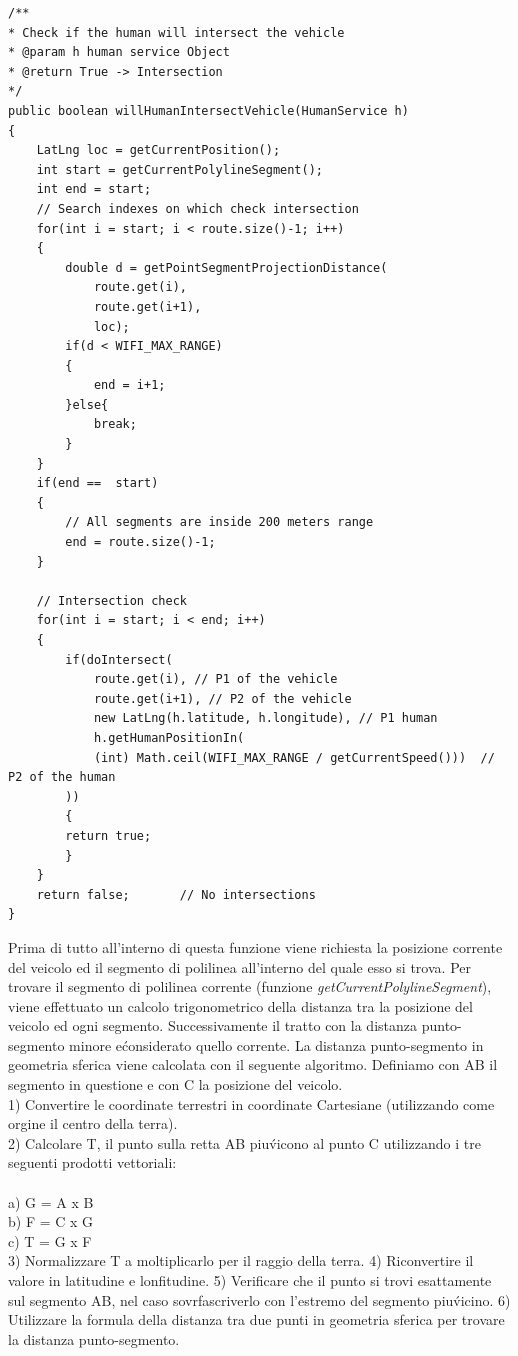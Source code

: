 \documentclass[conference]{IEEEtran}
\begin{document}
\begin{lstlisting}
/**
* Check if the human will intersect the vehicle
* @param h human service Object
* @return True -> Intersection
*/
public boolean willHumanIntersectVehicle(HumanService h) 
{
	LatLng loc = getCurrentPosition();
	int start = getCurrentPolylineSegment();
	int end = start;
	// Search indexes on which check intersection
	for(int i = start; i < route.size()-1; i++)
	{
		double d = getPointSegmentProjectionDistance(
			route.get(i),
			route.get(i+1),
			loc);
		if(d < WIFI_MAX_RANGE)
		{
			end = i+1;
		}else{
			break;
		}
	}
	if(end ==  start)
	{
		// All segments are inside 200 meters range
		end = route.size()-1;
	}

	// Intersection check
	for(int i = start; i < end; i++)
	{
		if(doIntersect(
			route.get(i), // P1 of the vehicle
			route.get(i+1), // P2 of the vehicle
			new LatLng(h.latitude, h.longitude), // P1 human
			h.getHumanPositionIn(
			(int) Math.ceil(WIFI_MAX_RANGE / getCurrentSpeed()))  // P2 of the human
		))
		{
		return true;
		}
	}
	return false;       // No intersections
}

\end{lstlisting}
Prima di tutto all'interno di questa funzione viene richiesta la posizione corrente del veicolo ed il segmento di polilinea all'interno del quale esso si trova.
Per trovare il segmento di polilinea corrente (funzione \textit{getCurrentPolylineSegment}), viene effettuato un calcolo trigonometrico della distanza tra la posizione del veicolo ed ogni segmento. Successivamente il tratto con la distanza punto-segmento minore e\' considerato quello corrente.
La distanza punto-segmento in geometria sferica viene calcolata con il seguente algoritmo.
Definiamo con AB il segmento in questione e con C la posizione del veicolo.\\
1) Convertire le coordinate terrestri in coordinate Cartesiane (utilizzando come orgine il centro della terra).\\
2) Calcolare T, il punto sulla retta AB piu\' vicono al  punto C utilizzando i tre seguenti prodotti vettoriali:
\\\\	a) G = A x B\\

	b) F = C x G\\

	c) T = G x F\\

3) Normalizzare T a moltiplicarlo per il raggio della terra.
4) Riconvertire il valore in latitudine e lonfitudine.
5) Verificare che il punto si trovi esattamente sul segmento AB, nel caso sovrfascriverlo con l'estremo del segmento piu\' vicino.
6) Utilizzare la formula della distanza tra due punti in geometria sferica per trovare la distanza punto-segmento.
\end{document}
